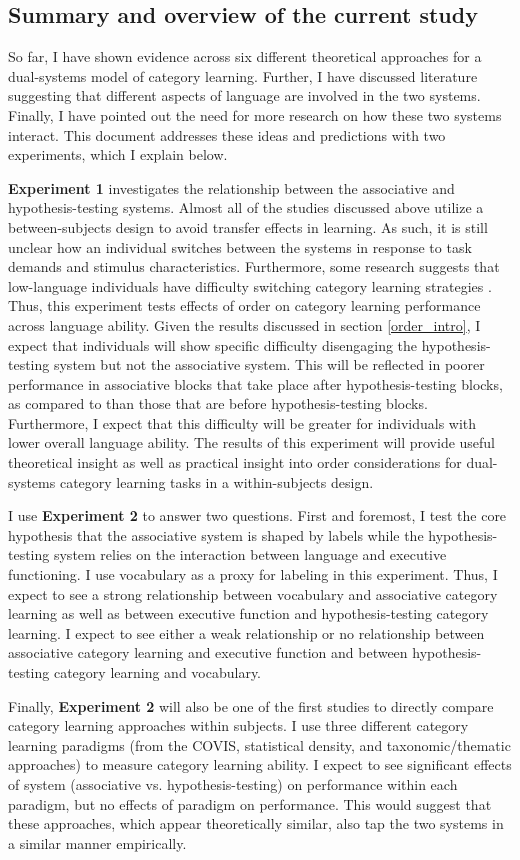 \documentclass[../dissertation.tex]{subfiles}
\begin{document}
\subsection{Summary and overview of the current study}
	So far, I have shown evidence across six different theoretical approaches for a dual-systems model of category learning. Further, I have discussed literature suggesting that different aspects of language are involved in the two systems. Finally, I have pointed out the need for more research on how these two systems interact. This document addresses these ideas and predictions with two experiments, which I explain below. \par
	\textbf{Experiment 1} investigates the relationship between the associative and hypothesis-testing systems. Almost all of the studies discussed above utilize a between-subjects design to avoid transfer effects in learning. As such, it is still unclear how an individual switches between the systems in response to task demands and stimulus characteristics. Furthermore, some research suggests that low-language individuals have difficulty switching category learning strategies \citep{Ryherd2019}. Thus, this experiment tests effects of order on category learning performance across language ability. Given the results discussed in section \ref{order_intro}, I expect that individuals will show specific difficulty disengaging the hypothesis-testing system but not the associative system. This will be reflected in poorer performance in associative blocks that take place after hypothesis-testing blocks, as compared to than those that are before hypothesis-testing blocks. Furthermore, I expect that this difficulty will be greater for individuals with lower overall language ability. The results of this experiment will provide useful theoretical insight as well as practical insight into order considerations for dual-systems category learning tasks in a within-subjects design. \par
	I use \textbf{Experiment 2} to answer two questions. First and foremost, I test the core hypothesis that the associative system is shaped by labels while the hypothesis-testing system relies on the interaction between language and executive functioning. I use vocabulary as a proxy for labeling in this experiment. Thus, I expect to see a strong relationship between vocabulary and associative category learning as well as between executive function and hypothesis-testing category learning. I expect to see either a weak relationship or no relationship between associative category learning and executive function and between hypothesis-testing category learning and vocabulary. \par
	Finally, \textbf{Experiment 2} will also be one of the first studies to directly compare category learning approaches within subjects. I use three different category learning paradigms (from the COVIS, statistical density, and taxonomic/thematic approaches) to measure category learning ability. I expect to see significant effects of system (associative vs. hypothesis-testing) on performance within each paradigm, but no effects of paradigm on performance. This would suggest that these approaches, which appear theoretically similar, also tap the two systems in a similar manner empirically.
\end{document}
